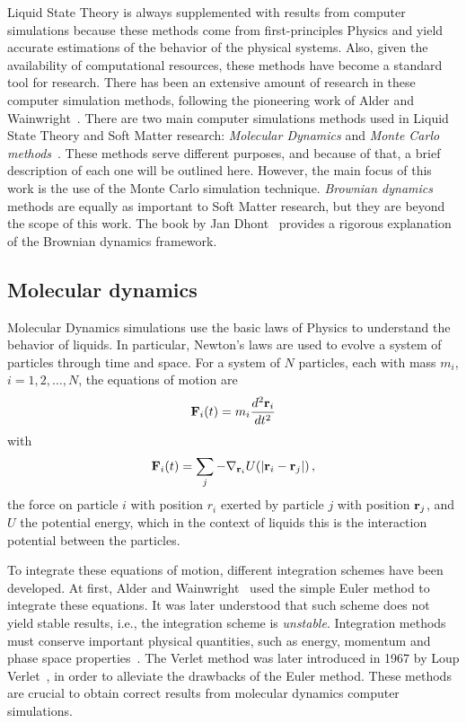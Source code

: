 Liquid State Theory is always supplemented with results from computer simulations
because these methods come from first-principles Physics and yield accurate estimations
of the behavior of the physical systems. Also, given the availability of computational
resources, these methods have become a standard tool for research.
There has been an extensive amount of research in these computer simulation methods,
following the pioneering work of Alder and Wainwright~\cite{alderPhaseTransitionHard1957a}.
There are two main computer simulations methods used in Liquid State Theory and
Soft Matter research: \emph{Molecular Dynamics} and \emph{Monte Carlo methods}~\cite{allenComputerSimulationLiquids2017,frenkelUnderstandingMolecularSimulation2001}.
These methods serve different purposes, and because of that, a brief description of each
one will be outlined here. However, the main focus of this work is the use of
the Monte Carlo simulation technique. \emph{Brownian dynamics} methods are
equally as important to Soft Matter research, but they are beyond the scope of this work.
The book by Jan Dhont~\cite{dhontIntroductionDynamicsColloids1996} provides a rigorous
explanation of the Brownian dynamics framework.

\subsection{Molecular dynamics}
Molecular Dynamics simulations use the basic laws of Physics to understand the behavior
of liquids. In particular, Newton's laws are used to evolve a system of particles through
time and space. For a system of $N$ particles, each with mass $m_i$, $i=1,2,\dots,N$,
the equations of motion are
\begin{equation}
    \mathbf{F}_i (t) = m_i \frac{d^2 \mathbf{r}_i}{dt^2}
    \label{eq:newton}
\end{equation}
with
\begin{equation}
    \mathbf{F}_i (t) = \sum_{j} - \nabla_{\mathbf{r}_i} U(\lvert \mathbf{r}_i - \mathbf{r}_j \rvert)
    \, ,
    \label{eq:newton-potential}
\end{equation}
the force on particle $i$ with position $r_i$ exerted by particle $j$ with position
$\mathbf{r}_j$, and $U$ the potential energy, which in the context of liquids this is the
interaction potential between the particles.

To integrate these equations of motion, different integration schemes have been developed.
At first, Alder and Wainwright~\cite{alderPhaseTransitionHard1957a} used the simple
Euler method to integrate these equations. It was later understood that such scheme
does not yield stable results, i.e., the integration scheme is \emph{unstable}.
Integration methods must conserve important physical quantities, such as energy,
momentum and phase space properties~\cite{razafindralandyReviewGeometricIntegrators2018}.
The Verlet method was later introduced in 1967 by Loup Verlet~\cite{verletComputerExperimentsClassical1967a},
in order to alleviate the drawbacks of the Euler method. These methods are crucial to obtain
correct results from molecular dynamics computer simulations.

